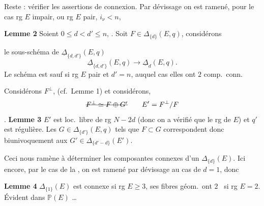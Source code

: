 \documentclass[11pt,a4paper]{article}
\begin{document}
Reste : vérifier les assertions de connexion. Par dévissage on est ramené, pour le
cas \struck{\ill{}} rg $E$ impair, ou rg $E$ pair, $i_\nu < n$,

\textbf{Lemme 2} Soient $0 \leqslant d < d' \leqslant n$,
\struck{\ill{}} . Soit $F \in \Delta_{\{d\}}(E,q)$, considérons

le sous-schéma de $\underline{\Delta}_{\{d,d'\}}(E,q)$
  
\[
  \underline{\Delta}_{\{d,d'\}}(E,q) \longrightarrow \underline{\Delta}_{d}(E,q) .
\]
Le schéma est  
 sauf si rg $E$ pair et $d' = n$, auquel cas elles
ont $2$ comp.\ conn.

Considérons $F^{\perp}$, (cf.\ Lemme 1) et considérons,
\[
  \text{\struck{$F^{\perp} \simeq F \oplus G'$}} \qquad E' = F^{\perp}/F
\]
.
 \textbf{Lemme 3} \struck{\ill{}} 
 $E'$ est loc.\ libre  de rg $N - 2d$
(donc on a \ill{} vérifié que le rg de $E$) et $q'$ est régulière. Les
$G \in \Delta_{\{d'\}}(E,q)$ tels que $F \subset G$ correspondent donc
biunivoquement aux $G' \in \Delta_{\{d'-d\}}(E')$.

Ceci nous ramène à déterminer les composantes connexes d'un $\Delta_{\{d\}}(E)$.
Ici encore, par le cas de la , on est ramené par dévissage au
cas de $d = 1$, donc  

\textbf{Lemme 4} $\Delta_{\{1\}}(E)$ est connexe si rg $E \geqslant 3$, ses fibres
géom.\ ont $2$ \ si rg $E = 2$.
Évident    dans $\mathbb{P}(E)$ …
\end{document}
